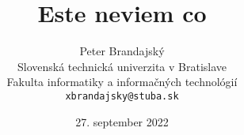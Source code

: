 \documentclass[10pt,a4paper]{article}
\title{Este neviem co}
\author{Peter Brandajský\\[2pt]
	{\small Slovenská technická univerzita v Bratislave}\\
	{\small Fakulta informatiky a informačných technológií}\\
	{\small \texttt{xbrandajsky@stuba.sk}}
	}
\date{27. september 2022}
\begin{document}
\maketitle

\begin{abstract}

\end{abstract}




\end{document}
